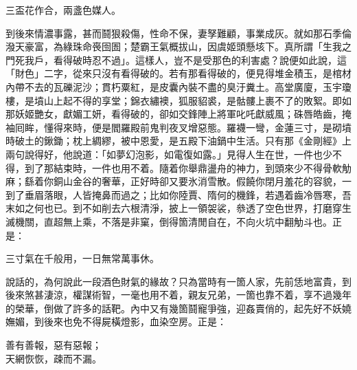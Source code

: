 \begin{myquote}
三盃花作合，兩盞色媒人。
\end{myquote}

到後來情濃事露，甚而鬪狠殺傷，{}性命不保，妻孥難顧，事業成灰。就如那石季倫潑天豪富，為綠珠命䘮囹圄；楚霸王氣概拔山，因虞姬頭懸垓下。真所謂「生我之門死我戶，看得破時忍不過」。這樣人，豈不是受那色的利害處？說便如此說，這「財色」二字，從來只沒有看得破的。{}若有那看得破的，便見得堆金積玉，是棺材內帶不去的瓦礫泥沙；貫朽粟紅，是皮囊內裝不盡的臭汙糞土。高堂廣廈，玉宇瓊樓，是墳山上起不得的享堂；錦衣繡襖，狐服貂裘，是骷髏上裹不了的敗絮。即如那妖姬艷女，獻媚工妍，看得破的，卻如交鋒陣上將軍叱吒獻威風；硃唇皓齒，掩袖囘眸，懂得來時，便是閻羅殿前鬼判夜叉增惡態。羅襪一彎，金蓮三寸，是砌墳時破土的鍬鋤；{}枕上綢繆，被中恩愛，是五殿下油鍋中生活。只有那《金剛經》上兩句說得好，他說道：「如夢幻泡影，如電復如露。」見得人生在世，一件也少不得，到了那結束時，一件也用不着。隨着你舉鼎盪舟的神力，到頭來少不得骨軟觔麻；繇着你銅山金谷的奢華，正好時卻又要氷消雪散。假饒你閉月羞花的容貌，一到了垂眉落眼，人皆掩鼻而過之；比如你陸賈、隋何的機鋒，若遇着齒冷唇寒，吾末如之何也已。{}到不如削去六根清淨，{}披上一領袈裟，叅透了空色世界，打磨穿生滅機關，直超無上乘，不落是非窠，倒得箇清閒自在，不向火坑中翻觔斗也。正是：

\begin{myquote}
三寸氣在千般用，一日無常萬事休。
\end{myquote}

說話的，為何說此一段酒色財氣的緣故？只為當時有一箇人家，先前恁地富貴，到後來煞甚淒涼，權謀術智，一毫也用不着，親友兄弟，一箇也靠不着，享不過幾年的榮華，倒做了許多的話靶。內中又有幾箇鬪寵爭強，迎姦賣俏的，起先好不妖嬈嫵媚，到後來也免不得屍橫燈影，血染空房。正是：

\begin{myquote}
善有善報，惡有惡報；\\天網恢恢，疎而不漏。
\end{myquote}

